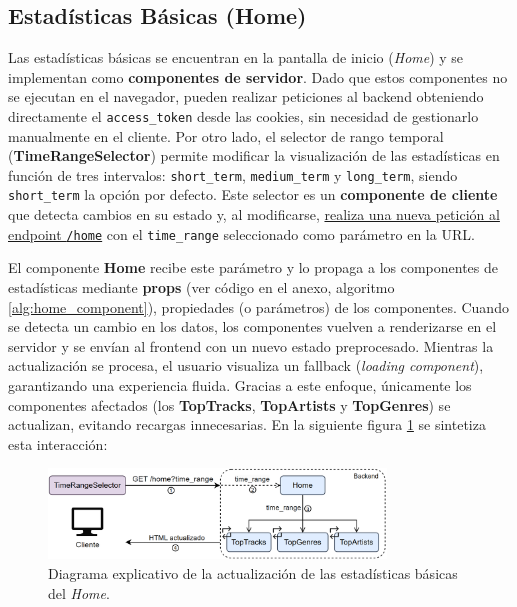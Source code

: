 \subsection{Estadísticas Básicas (Home)}

Las estadísticas básicas se encuentran en la pantalla de inicio (\textit{Home}) y se implementan como \textbf{componentes de servidor}. Dado que estos componentes no se ejecutan en el navegador, pueden realizar peticiones al backend obteniendo directamente el \texttt{access\_token} desde las cookies, sin necesidad de gestionarlo manualmente en el cliente. Por otro lado, el selector de rango temporal (\textbf{TimeRangeSelector}) permite modificar la visualización de las estadísticas en función de tres intervalos: \texttt{short\_term}, \texttt{medium\_term} y \texttt{long\_term}, siendo \texttt{short\_term} la opción por defecto. Este selector es un \textbf{componente de cliente} que detecta cambios en su estado y, al modificarse, \underline{realiza una nueva petición al endpoint \texttt{/home}} con el \texttt{time\_range} seleccionado como parámetro en la URL.

El componente \textbf{Home} recibe este parámetro y lo propaga a los componentes de estadísticas mediante \textbf{props} (ver código en el anexo, algoritmo \ref{alg:home_component}), propiedades (o parámetros) de los componentes. Cuando se detecta un cambio en los datos, los componentes vuelven a renderizarse en el servidor y se envían al frontend con un nuevo estado preprocesado. Mientras la actualización se procesa, el usuario visualiza un fallback (\textit{loading component}), garantizando una experiencia fluida. Gracias a este enfoque, únicamente los componentes afectados (los \textbf{TopTracks}, \textbf{TopArtists} y \textbf{TopGenres}) se actualizan, evitando recargas innecesarias. En la siguiente figura \ref{fig:actualizacion_tops} se sintetiza esta interacción:

\begin{figure}[H]
    \centering
    \includegraphics[width=0.8\textwidth]{figures/implementacion/actualizacion_tops.png}
    \vspace{10pt}
    \caption{Diagrama explicativo de la actualización de las estadísticas básicas del \textit{Home}.}
    \label{fig:actualizacion_tops}
\end{figure}

